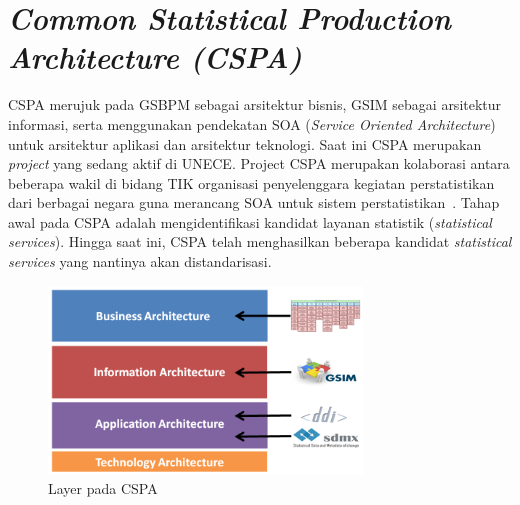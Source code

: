 \section{\textit{Common Statistical Production Architecture (CSPA)}}
CSPA merujuk pada GSBPM sebagai arsitektur bisnis, GSIM sebagai arsitektur informasi, serta menggunakan pendekatan SOA (\textit{Service Oriented Architecture}) untuk arsitektur aplikasi dan arsitektur teknologi. Saat ini CSPA merupakan \textit{project} yang sedang aktif di UNECE. Project CSPA merupakan kolaborasi antara beberapa wakil di bidang TIK organisasi penyelenggara kegiatan perstatistikan dari berbagai negara guna merancang SOA untuk sistem perstatistikan~\cite{_cspa_????}. Tahap awal pada CSPA adalah mengidentifikasi kandidat layanan statistik (\textit{statistical services}). Hingga saat ini, CSPA telah menghasilkan beberapa kandidat \textit{statistical services} yang nantinya akan distandarisasi.

\begin{figure}[H]
    \centering
    \includegraphics[height=5cm]{images/cspa-layer}
    \caption{Layer pada CSPA}
    \label{fig:cspa-layer}
\end{figure}

